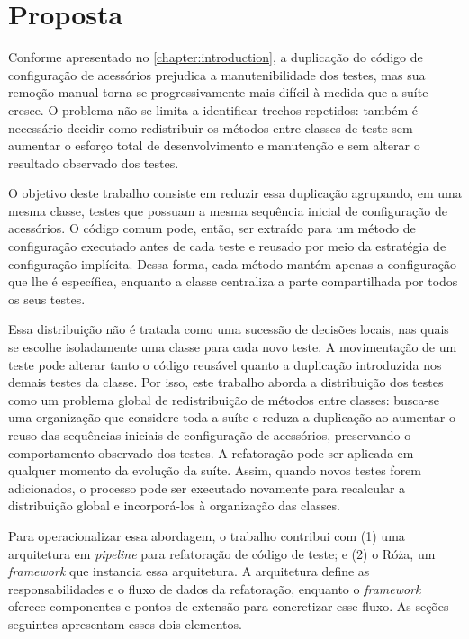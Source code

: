\chapter{Proposta}
\label{chapter:proposal}

Conforme apresentado no \autoref{chapter:introduction}, a duplicação do código de configuração de acessórios prejudica a manutenibilidade dos testes, mas sua remoção manual torna-se progressivamente mais difícil à medida que a suíte cresce. O problema não se limita a identificar trechos repetidos: também é necessário decidir como redistribuir os métodos entre classes de teste sem aumentar o esforço total de desenvolvimento e manutenção e sem alterar o resultado observado dos testes.

O objetivo deste trabalho consiste em reduzir essa duplicação agrupando, em uma mesma classe, testes que possuam a mesma sequência inicial de configuração de acessórios. O código comum pode, então, ser extraído para um método de configuração executado antes de cada teste e reusado por meio da estratégia de configuração implícita. Dessa forma, cada método mantém apenas a configuração que lhe é específica, enquanto a classe centraliza a parte compartilhada por todos os seus testes.

Essa distribuição não é tratada como uma sucessão de decisões locais, nas quais se escolhe isoladamente uma classe para cada novo teste. A movimentação de um teste pode alterar tanto o código reusável quanto a duplicação introduzida nos demais testes da classe. Por isso, este trabalho aborda a distribuição dos testes como um problema global de redistribuição de métodos entre classes: busca-se uma organização que considere toda a suíte e reduza a duplicação ao aumentar o reuso das sequências iniciais de configuração de acessórios, preservando o comportamento observado dos testes. A refatoração pode ser aplicada em qualquer momento da evolução da suíte. Assim, quando novos testes forem adicionados, o processo pode ser executado novamente para recalcular a distribuição global e incorporá-los à organização das classes.

Para operacionalizar essa abordagem, o trabalho contribui com (1) uma arquitetura em \textit{pipeline} para refatoração de código de teste; e (2) o Róża, um \textit{framework} que instancia essa arquitetura. A arquitetura define as responsabilidades e o fluxo de dados da refatoração, enquanto o \textit{framework} oferece componentes e pontos de extensão para concretizar esse fluxo. As seções seguintes apresentam esses dois elementos.

